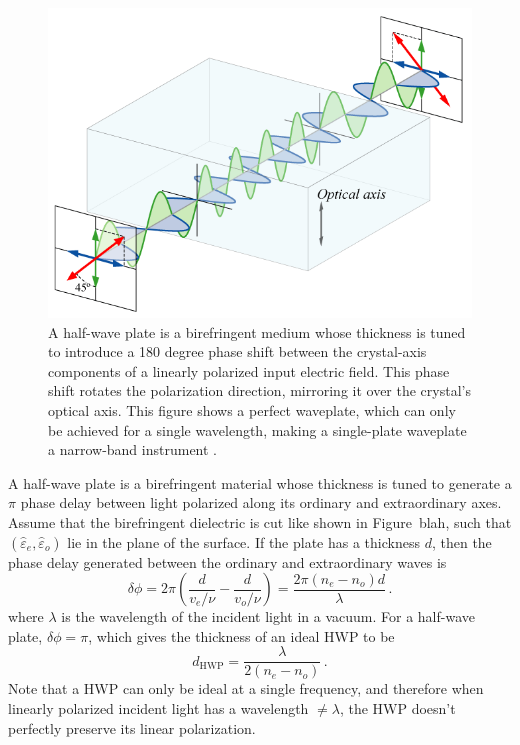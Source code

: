 \begin{figure}
    \centering
    \includegraphics[width=0.7\linewidth]{PolarizationModulation/Figures/Waveplate.png}
    \caption[Depiction of how a half-wave plate manipulates polarization orientation]{A half-wave plate is a birefringent medium whose thickness is tuned to introduce a 180 degree phase shift between the crystal-axis components of a linearly polarized input electric field. This phase shift rotates the polarization direction, mirroring it over the crystal's optical axis. This figure shows a perfect waveplate, which can only be achieved for a single wavelength, making a single-plate waveplate a narrow-band instrument \cite{noauthor_waveplate_2019}.}
    \label{fig:halfwave_plate_cartoon}
\end{figure}

A half-wave plate is a birefringent material whose thickness is tuned to generate a $\pi$ phase delay between light polarized along its ordinary and extraordinary axes. Assume that the birefringent dielectric is cut like shown in Figure~blah, such that $(\hat{\varepsilon}_{e}, \hat{\varepsilon}_{o})$ lie in the plane of the surface. If the plate has a thickness $d$, then the phase delay generated between the ordinary and extraordinary waves is
\begin{equation}
    \delta \phi = 2 \pi \left( \frac{d}{v_{e} / \nu} - \frac{d}{v_{o} / \nu} \right) = \frac{2 \pi \left( n_{e} - n_{o} \right) d}{\lambda} \, .
    \label{eq:birefringent_phase_delay}
\end{equation}
where $\lambda$ is the wavelength of the incident light in a vacuum. For a half-wave plate, $\delta \phi = \pi$, which gives the thickness of an ideal HWP to be
\begin{equation}
    d_{\mathrm{HWP}} = \frac{\lambda}{2 \left( n_{e} - n_{o} \right)} \, .
    \label{eq:hwp_ideal_thickness}
\end{equation}
Note that a HWP can only be ideal at a single frequency, and therefore when linearly polarized incident light has a wavelength $\neq \lambda$, the HWP doesn't perfectly preserve its linear polarization.


